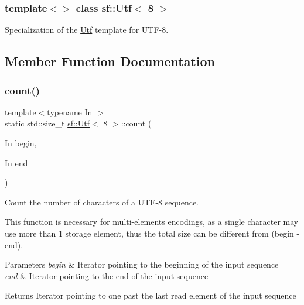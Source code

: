 \subsubsection*{template$<$$>$\newline
class sf\+::\+Utf$<$ 8 $>$}

Specialization of the \hyperlink{classsf_1_1_utf}{Utf} template for U\+T\+F-\/8. 

\subsection{Member Function Documentation}
\mbox{\label{classsf_1_1_utf_3_018_01_4_af1f15d9a772ee887be39e97431e15d32}} 
\subsubsection{\texorpdfstring{count()}{count()}}
{\footnotesize\ttfamily template$<$typename In $>$ \\
static std\+::size\+\_\+t \hyperlink{classsf_1_1_utf}{sf\+::\+Utf}$<$ 8 $>$\+::count (\begin{DoxyParamCaption}\item[{In}]{begin,  }\item[{In}]{end }\end{DoxyParamCaption})\hspace{0.3cm}{\ttfamily [static]}}



Count the number of characters of a U\+T\+F-\/8 sequence. 

This function is necessary for multi-\/elements encodings, as a single character may use more than 1 storage element, thus the total size can be different from (begin -\/ end).


\begin{DoxyParams}{Parameters}
{\em begin} & Iterator pointing to the beginning of the input sequence \\
\hline
{\em end} & Iterator pointing to the end of the input sequence\\
\hline
\end{DoxyParams}
\begin{DoxyReturn}{Returns}
Iterator pointing to one past the last read element of the input sequence 
\end{DoxyReturn}
\mbox{\label{classsf_1_1_utf_3_018_01_4_a59d4e8d5832961e62b263d308b72bf4b}} 
